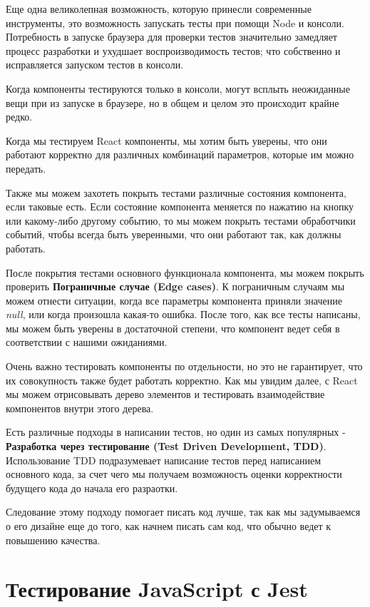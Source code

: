Еще одна великолепная возможность, которую принесли современные инструменты, это возможность запускать тесты при помощи Node и консоли. Потребность в запуске браузера для проверки тестов значительно замедляет процесс разработки и ухудшает воспроизводимость тестов; что собственно и исправляется запуском тестов в консоли.

Когда компоненты тестируются только в консоли, могут всплыть неожиданные вещи при из запуске в браузере, но в общем и целом это происходит крайне редко.

Когда мы тестируем React компоненты, мы хотим быть уверены, что они работают корректно для различных комбинаций параметров, которые им можно передать. 

Также мы можем захотеть покрыть тестами различные состояния компонента, если таковые есть. Если состояние компонента меняется по нажатию на кнопку или какому-либо другому событию, то мы можем покрыть тестами обработчики событий, чтобы всегда быть уверенными, что они работают так, как должны работать.

После покрытия тестами основного функционала компонента, мы можем покрыть проверить \textbf{Пограничные случае (Edge cases)}. К пограничным случаям мы можем отнести ситуации, когда все параметры компонента приняли значение \textit{null}, или когда произошла какая-то ошибка. После того, как все тесты написаны, мы можем быть уверены в достаточной степени, что компонент ведет себя в соответствии с нашими ожиданиями.

Очень важно тестировать компоненты по отдельности, но это не гарантирует, что их совокупность также будет работать корректно. Как мы увидим далее, с React мы можем отрисовывать дерево элементов и тестировать взаимодействие компонентов внутри этого дерева. 

Есть различные подходы в написании тестов, но один из самых популярных - \textbf{Разработка через тестирование (Test Driven Development, TDD)}. Использование TDD подразумевает написание тестов перед написанием основного кода, за счет чего мы получаем возможность оценки корректности будущего кода до начала его разраотки. 

Следование этому подходу помогает писать код лучше, так как мы задумываемся о его дизайне еще до того, как начнем писать сам код, что обычно ведет к повышению качества.

\section{Тестирование JavaScript с Jest}

